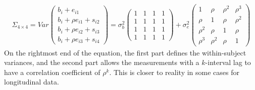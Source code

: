 \documentclass[12pt]{article}
\begin{document}
\begin{eqnarray}
\Sigma_{4\times 4} = Var 
\begin{pmatrix}
b_i + e_{i1}\\
b_i + \rho e_{i1} + s_{i2}\\
b_i + \rho e_{i2} + s_{i3}\\
b_i + \rho e_{i3} + s_{i4}
\end{pmatrix}
= \sigma_b^2
\begin{pmatrix}
1 & 1 & 1 & 1\\
1 & 1 & 1 & 1\\
1 & 1 & 1 & 1\\
1 & 1 & 1 & 1
\end{pmatrix}
+ \sigma_e^2 
\begin{pmatrix}
1 & \rho & \rho^2 & \rho^3 \\
\rho & 1 & \rho & \rho^2 \\
\rho^2 & \rho & 1 & \rho \\
\rho^3 & \rho^2 & \rho & 1
\end{pmatrix}
\label{eq:v-cov_split}
\end{eqnarray}
On the rightmost end of the equation, the first part defines the within-subject variances, and the second part allows the measurements with a $k$-interval lag to have a correlation coefficient of $\rho ^ k$. This is closer to reality in some cases for longitudinal data.
\end{document}
